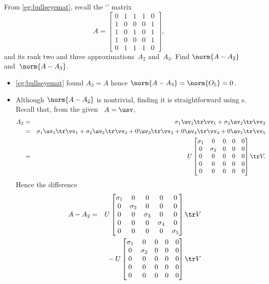 \begin{example} \label{eg:}
From \autoref{eg:bullseyemat}, recall the `' matrix
\begin{equation*}
A=\begin{bmatrix} 0&1&1&1&0
\\1&0&0&0&1
\\1&0&1&0&1
\\1&0&0&0&1
\\0&1&1&1&0 \end{bmatrix},
\end{equation*}
and its rank two and three approximations~\(A_2\) and~\(A_3\).
Find \(\norm{A-A_2}\) and~\(\norm{A-A_3}\).
\begin{solution} 
\begin{itemize}
\item \autoref{eg:bullseyemat} found \(A_3=A\) hence \(\norm{A-A_3}=\norm{O_5}=0\)\,.
\item Although \(\norm{A-A_2}\) is nontrivial, finding it is straightforward using \svd{}s.
Recall that, from the given \svd\ \(A=\usv\),
\begin{eqnarray*}
A_2&=&\sigma_1\uv_1\tr\vv_1+\sigma_2\uv_2\tr\vv_2
\\&=&\sigma_1\uv_1\tr\vv_1+\sigma_2\uv_2\tr\vv_2+0\uv_3\tr\vv_3+0\uv_4\tr\vv_4+0\uv_5\tr\vv_5
\\&=&U\begin{bmatrix} \sigma_1&0&0&0&0
\\0&\sigma_2&0&0&0
\\0&0&0&0&0
\\0&0&0&0&0
\\0&0&0&0&0 \end{bmatrix}\tr V.
\end{eqnarray*}
Hence the difference
\begin{eqnarray*}
A-A_2&=&U\begin{bmatrix} \sigma_1&0&0&0&0
\\0&\sigma_2&0&0&0
\\0&0&\sigma_3&0&0
\\0&0&0&\sigma_4&0
\\0&0&0&0&\sigma_5 \end{bmatrix}\tr V
\\&&{}
-U\begin{bmatrix} \sigma_1&0&0&0&0
\\0&\sigma_2&0&0&0
\\0&0&0&0&0
\\0&0&0&0&0
\\0&0&0&0&0 \end{bmatrix}\tr V

\end{eqnarray*}
\end{itemize}
\end{solution}
\end{example}

